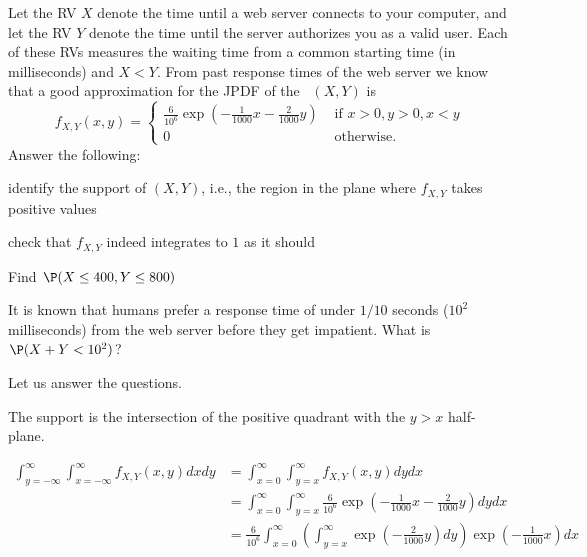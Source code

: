 \begin{example}\label{Eg:PlotPDF2ServerTimes}
Let the RV $X$ denote the time until a web server connects to your computer, and let the RV $Y$ denote the time until the server authorizes you as a valid user.  
Each of these RVs measures the waiting time from a common starting time (in milliseconds) and $X < Y$.  
From past response times of the web server we know that a good approximation for the JPDF of the \rv~$(X,Y)$ is
\[
f_{X,Y}(x,y) = 
\begin{cases}
\frac{6}{10^6} \exp \left( -\frac{1}{1000}x-\frac{2}{1000}y \right)
& \text{ if } x>0,y>0,x <y\\
0 & \text{ otherwise}.
\end{cases}
\]
Answer the following:
\be
\item identify the support of $(X,Y)$, i.e., the region in the plane where $f_{X,Y}$ takes positive values
\item check that $f_{X,Y}$ indeed integrates to $1$ as it should
\item Find $\P(X \leq 400, Y \leq 800)$
\item It is known that humans prefer a response time of under $1/10$ seconds ($10^2$ milliseconds) from the web server before they get impatient.  What is $\P(X+Y < 10^2)$? 
\ee
\begin{center}
\end{center}
Let us answer the questions.
\be
\item
The support is the intersection of the positive quadrant with the $y>x$ half-plane.
\item
{\scriptsize
\begin{align*}
\int_{y=-\infty}^{\infty}\int_{x=-\infty}^{\infty} f_{X,Y}(x,y) dx dy 
&= \int_{x=0}^{\infty}\int_{y=x}^{\infty} f_{X,Y}(x,y) dy dx\\
&= \int_{x=0}^{\infty}\int_{y=x}^{\infty} \frac{6}{10^6} \exp \left( -\frac{1}{1000}x-\frac{2}{1000}y \right) dy dx\\
&= \frac{6}{10^6} \int_{x=0}^{\infty} \left(\int_{y=x}^{\infty} \exp \left( -\frac{2}{1000}y \right) dy \right) \exp \left(-\frac{1}{1000}x\right) dx\\

\end{align*}}
\end{example}
